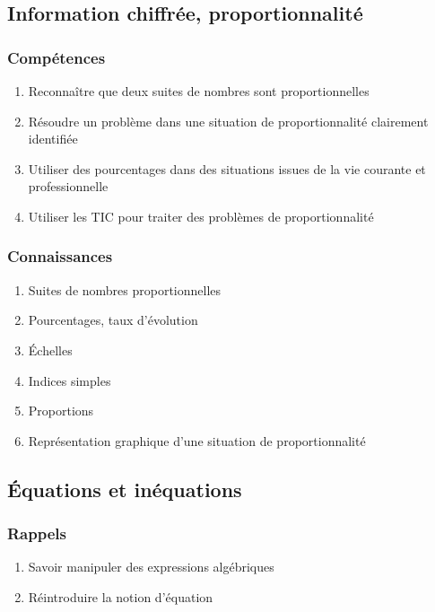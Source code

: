 \documentclass[12pt,a4paper]{article}
\begin{document}
\subsection{Information chiffrée, proportionnalité}
	\subsubsection*{Compétences}
	\begin{enumerate}
		\item Reconnaître que deux suites de nombres sont proportionnelles
		\item Résoudre un problème dans une situation de proportionnalité clairement identifiée
		\item Utiliser des pourcentages dans des situations issues de la vie courante et professionnelle
		\item Utiliser les TIC pour traiter des problèmes de proportionnalité
	\end{enumerate}
	
	\subsubsection*{Connaissances}
	\begin{enumerate}
		\item Suites de nombres proportionnelles
		\item Pourcentages, taux d'évolution
		\item \'Echelles
		\item Indices simples
		\item Proportions
		\item Représentation graphique d'une situation de proportionnalité
	\end{enumerate}

\subsection{\'Equations et inéquations}
	\subsubsection*{Rappels}
		\begin{enumerate}
			\item Savoir manipuler des expressions algébriques
			\item Réintroduire la notion d'équation
		\end{enumerate}
\end{document}
